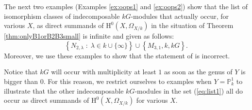 \documentclass{amsart}
\numberwithin{equation}{section}
\numberwithin{table}{section}
\theoremstyle{plain}
\theoremstyle{definition}
\theoremstyle{remark}
\newcommand{\HH}{\mathrm{H}}
\begin{document}
The next two examples (Examples \ref{ex:oops1} and \ref{ex:oops2}) show that the list of isomorphism classes of indecomposable $kG$-modules that actually occur, for various $X$, as direct summands of $\HH^0(X,\Omega_{X/k})$ in the situation of Theorem \ref{thm:onlyB1orB2B3small} is infinite and given as follows:
\begin{equation}
\label{eq:list1}
\left\{N_{2,\lambda}\;:\;\lambda\in k \cup\{\infty\}\right\} \cup \left\{M_{3,1},k,kG\right\}.
\end{equation}
Moreover, we use these examples to show that the statement of \cite[Theorem 6.4]{MarquesWard2018} is incorrect.

Notice that $kG$ will occur with multiplicity at least $1$ as soon as the genus of $Y$ is bigger than 0. For this reason, we restrict ourselves to examples when $Y=\mathbb{P}^1_k$ to illustrate that the other indecomposable $kG$-modules in the set (\ref{eq:list1}) all do occur as direct summands of $\HH^0(X,\Omega_{X/k})$ for various $X$.
\end{document}
